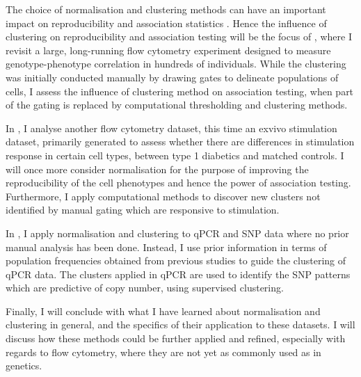 The choice of normalisation and clustering methods can have an important impact on reproducibility and association statistics \citep{Plagnol:2007dw}.
Hence the influence of clustering on reproducibility and association testing will be the focus of , where I revisit a large,
long-running flow cytometry experiment designed to measure genotype-phenotype correlation in hundreds of individuals.
While the clustering was initially conducted manually by drawing gates to delineate populations of cells,
I assess the influence of clustering method on association testing,
when part of the gating is replaced by computational thresholding and clustering methods.

In , I analyse another flow cytometry dataset, this time an exvivo stimulation dataset,
primarily generated to assess whether there are differences in stimulation response in certain cell types, between type 1 diabetics and matched controls.
I will once more consider normalisation for the purpose of improving the reproducibility of the cell phenotypes and hence the power of association testing.
Furthermore, I apply computational methods to discover new clusters not identified by manual gating which are responsive to stimulation.

In , I apply normalisation and clustering to \gls{qPCR} and \gls{SNP} data where no prior manual analysis has been done.
Instead, I use prior information in terms of population frequencies obtained from previous studies to guide the clustering of qPCR data.
The clusters applied in qPCR are used to identify the SNP patterns which are predictive of copy number, using supervised clustering.

Finally, I will conclude with what I have learned about normalisation and clustering in general, and the specifics of their application to these datasets.
I will discuss how these methods could be further applied and refined, especially with regards to flow cytometry,
where they are not yet as commonly used as in genetics.  

